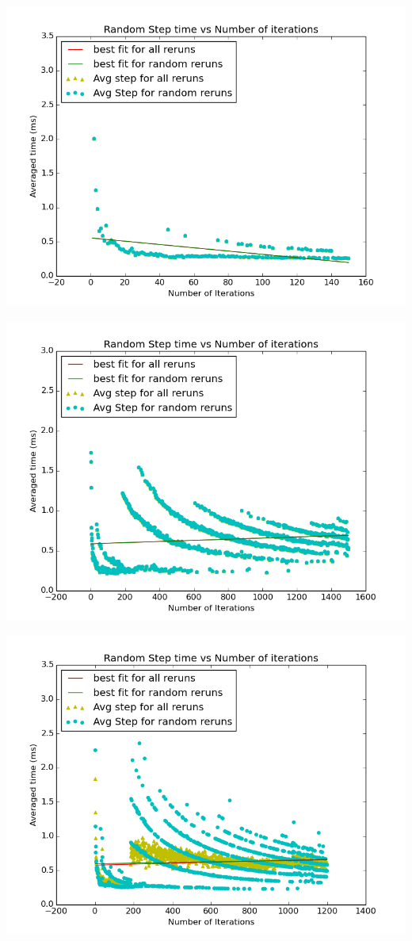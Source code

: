 \documentclass[11pt]{article}
\begin{document}
	\begin{center}
	  \includegraphics[scale=0.5]{images/g26_plot04_150x10_even}
	\end{center}
	\begin{center}
	  \includegraphics[scale=0.5]{images/g26_plot04_1500x10_random}
	\end{center}
	\begin{center}
	  \includegraphics[scale=0.5]{images/g26_plot04_1200x150_uneven}
	\end{center}
	
\end{document}
